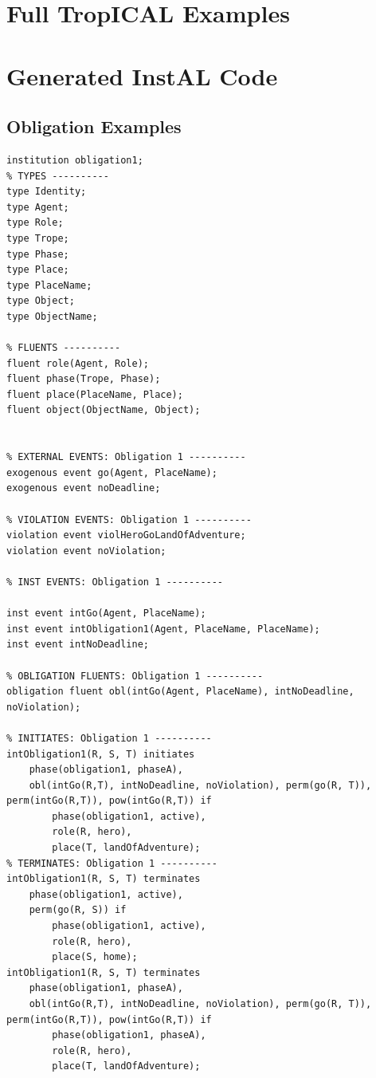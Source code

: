 \documentclass[11pt]{report}
\begin{document}
\chapter{Full TropICAL Examples}
\label{appendix:tropes}

\chapter{Generated InstAL Code}
\label{appendix:instal}

\section{Obligation Examples}
\label{appendix:obls}
\begin{lstlisting}[label={lst:obl1-instal},caption={An obligation event with no
deadline or consequence events}]
institution obligation1;
% TYPES ----------
type Identity;
type Agent;
type Role;
type Trope;
type Phase;
type Place;
type PlaceName;
type Object;
type ObjectName;

% FLUENTS ----------
fluent role(Agent, Role);
fluent phase(Trope, Phase);
fluent place(PlaceName, Place);
fluent object(ObjectName, Object);


% EXTERNAL EVENTS: Obligation 1 ----------
exogenous event go(Agent, PlaceName);
exogenous event noDeadline;

% VIOLATION EVENTS: Obligation 1 ----------
violation event violHeroGoLandOfAdventure;
violation event noViolation;

% INST EVENTS: Obligation 1 ----------

inst event intGo(Agent, PlaceName);
inst event intObligation1(Agent, PlaceName, PlaceName);
inst event intNoDeadline;

% OBLIGATION FLUENTS: Obligation 1 ----------
obligation fluent obl(intGo(Agent, PlaceName), intNoDeadline, noViolation);

% INITIATES: Obligation 1 ----------
intObligation1(R, S, T) initiates
    phase(obligation1, phaseA),
    obl(intGo(R,T), intNoDeadline, noViolation), perm(go(R, T)), perm(intGo(R,T)), pow(intGo(R,T)) if
        phase(obligation1, active),
        role(R, hero),
        place(T, landOfAdventure);
% TERMINATES: Obligation 1 ----------
intObligation1(R, S, T) terminates
    phase(obligation1, active),
    perm(go(R, S)) if
        phase(obligation1, active),
        role(R, hero),
        place(S, home);
intObligation1(R, S, T) terminates
    phase(obligation1, phaseA),
    obl(intGo(R,T), intNoDeadline, noViolation), perm(go(R, T)), perm(intGo(R,T)), pow(intGo(R,T)) if
        phase(obligation1, phaseA),
        role(R, hero),
        place(T, landOfAdventure);



\end{lstlisting}
\end{document}
